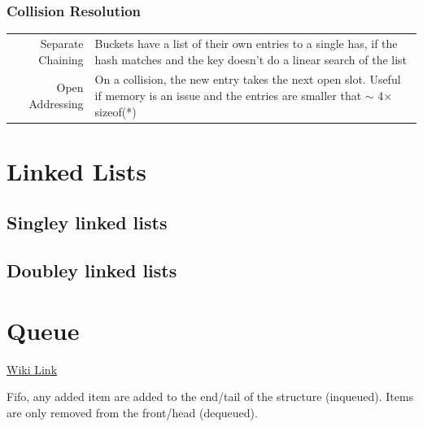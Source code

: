 \documentclass{notes}
\begin{document}
{\subsubsection{Collision Resolution}
\begin{tabular}{r p{}}
	Separate Chaining&Buckets have a list of their own entries to a single has, if the hash matches and the key doesn't do a linear search of the list\\
	Open Addressing&On a collision, the new entry takes the next open slot. Useful if memory is an issue and the entries are smaller that $\sim$ 4$\times$ sizeof(*)\\

\end{tabular}

\section{Linked Lists}
\subsection{Singley linked lists}
\begin{center}
\end{center}
\subsection{Doubley linked lists}


\section{Queue}

\href{https://en.wikipedia.org/wiki/Queue_(abstract_data_type)}{Wiki Link}

Fifo, any added item are added to the end/tail of the structure (inqueued). Items are only removed from the front/head (dequeued). 

}
\end{document}
